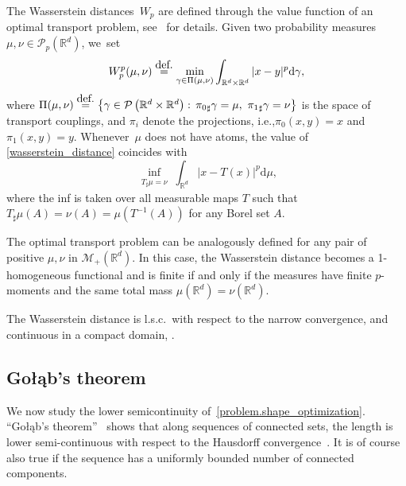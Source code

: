 \documentclass[11pt]{article}
\newcommand{\ie}{i.e.,\xspace}
\numberwithin{equation}{section}
\theoremstyle{definition}
\newcommand{\eqdef}{\ensuremath{\stackrel{\mbox{\upshape\tiny def.}}{=}}}
\newcommand{\RR}{\mathbb{R}}
\newcommand\dd{\mathrm{d}}
\begin{document}
The Wasserstein distan\-ces~$W_p$ are defined through the value function of an optimal transport problem, see~\cite{ambrosio2008gradient,santambrogio2015optimal,villani2009optimal} for details. Given two probability measures $\mu, \nu \in \mathcal{P}_p(\RR^d)$, we~set
\begin{equation}\label{wasserstein_distance}
W_p^p(\mu, \nu)
\eqdef
\min_{\gamma \in \Pi(\mu, \nu)}
\int_{\RR^d\times \RR^d} |x - y|^p\dd\gamma,
\end{equation}
where
$\Pi(\mu, \nu) \eqdef
\left\{
\gamma \in \mathcal{P}\left(\RR^d\times \RR^d\right) :
\,
{\pi_{0}}_\sharp\gamma = \mu, \
{\pi_{1}}_\sharp\gamma = \nu
\right\}
$
is the space of transport couplings, and $\pi_i$ denote the projections, \ie $\pi_0(x,y) = x$ and $\pi_1(x,y) = y$. Whenever~$\mu$ does not have atoms, the value of \eqref{wasserstein_distance} coincides with
\begin{equation}\label{wasserstein_distance.monge}
\inf_{
\substack{
T_{\sharp}\mu = \nu
}
}
\int_{\RR^d} |x - T(x)|^p\dd \mu,
\end{equation}
where the inf is taken over all measurable maps $T$ such that $T_\sharp\mu(A) = \nu(A) = \mu(T^{-1}(A))$ for any Borel set $A$.

The optimal transport problem can be analogously defined for any pair of positive $\mu, \nu$ in $\mathcal{M}_+(\RR^d)$. In this case, the Wasserstein distance becomes a 1-homogeneous functional and is finite if and only if the measures have finite $p$-moments and the same total mass $\mu(\RR^d) = \nu(\RR^d)$.

The Wasserstein distance is l.s.c.~with respect to the narrow convergence, and continuous in a compact domain, \cite[Lem.\,4.3]{villani2009optimal}.

\newcommand{\Golab}{Go\l\k{a}b}
\subsection{\Golab's theorem}
We now study the lower semicontinuity of~\eqref{problem.shape_optimization}.
``\Golab's theorem''~\cite{Golab} shows that along sequences of connected sets, the length is lower semi-continuous with respect to the Hausdorff convergence~\cite[Chap.\,10]{morel2012variational}.
It is of course also true if the sequence has a uniformly bounded number of connected components.
\end{document}
